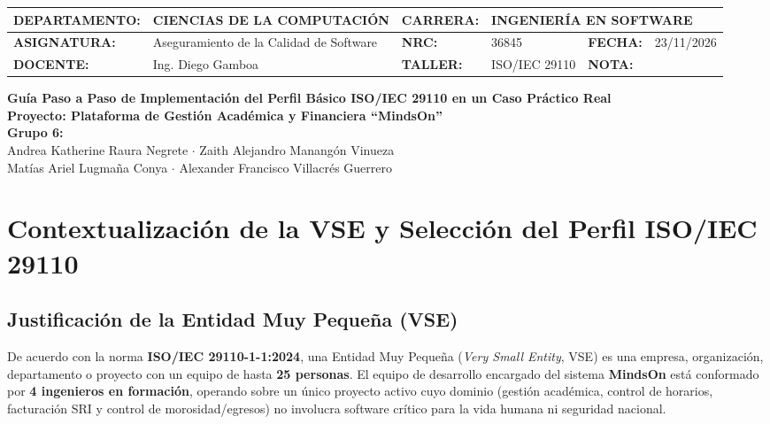\documentclass[11pt,a4paper]{article}
\begin{document}
\begin{center}
  \renewcommand{\arraystretch}{1.3}
  \begin{tabular}{|p{3.2cm}|p{4.3cm}|p{2.5cm}|p{2.2cm}|p{1.6cm}|p{1.8cm}|}
    \hline
    \rowcolor{tableHeader}
    \textbf{DEPARTAMENTO:} & CIENCIAS DE LA COMPUTACIÓN & \textbf{CARRERA:} & \multicolumn{3}{l|}{INGENIERÍA EN SOFTWARE} \\
    \hline
    \textbf{ASIGNATURA:} & Aseguramiento de la Calidad de Software & \textbf{NRC:} & 36845 & \textbf{FECHA:} & 23/11/2026 \\
    \hline
    \textbf{DOCENTE:} & Ing. Diego Gamboa & \textbf{TALLER:} & ISO/IEC 29110 & \textbf{NOTA:} & \\
    \hline
  \end{tabular}
\end{center}

\vspace{0.3cm}

\begin{center}
  {\LARGE \textbf{\textcolor{mindsonBlue}{Guía Paso a Paso de Implementación del Perfil Básico ISO/IEC 29110 en un Caso Práctico Real}}}\\[0.2cm]
  {\large \textbf{Proyecto: Plataforma de Gestión Académica y Financiera ``MindsOn''}}\\[0.3cm]
  \textbf{Grupo 6:}\\
  Andrea Katherine Raura Negrete $\cdot$ Zaith Alejandro Manangón Vinueza\\
  Matías Ariel Lugmaña Conya $\cdot$ Alexander Francisco Villacrés Guerrero
\end{center}

\vspace{0.2cm}
\tableofcontents
\newpage

\section{Contextualización de la VSE y Selección del Perfil ISO/IEC 29110}

\subsection{Justificación de la Entidad Muy Pequeña (VSE)}
De acuerdo con la norma \textbf{ISO/IEC 29110-1-1:2024}, una Entidad Muy Pequeña (\textit{Very Small Entity}, VSE) es una empresa, organización, departamento o proyecto con un equipo de hasta \textbf{25 personas}. El equipo de desarrollo encargado del sistema \textbf{MindsOn} está conformado por \textbf{4 ingenieros en formación}, operando sobre un único proyecto activo cuyo dominio (gestión académica, control de horarios, facturación SRI y control de morosidad/egresos) no involucra software crítico para la vida humana ni seguridad nacional.
\end{document}
